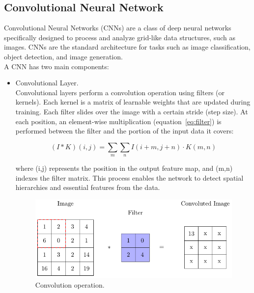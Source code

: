 \subsection{Convolutional Neural Network}

Convolutional Neural Networks (CNNs) are a class of deep neural networks specifically designed to process and analyze grid-like data structures, 
such as images. CNNs are the standard architecture for tasks such as image 
classification, object detection, and image generation.\\

A CNN has two main components:

\begin{itemize}
    \item Convolutional Layer.\\
    Convolutional layers perform a convolution operation using filters (or kernels).
    Each kernel is a matrix of learnable weights that are updated during training.
    Each filter slides over the image with a certain stride (step size). At each position, 
    an element-wise multiplication (equation~\ref{eq:filter}) is performed between the filter and the portion of the input data it covers:

    \begin{equation}
        (I * K)(i,j)= \sum_m \sum_n I(i+m,j+n) \cdot K(m,n)
    \label{eq:filter}
    \end{equation}

    where (i,j) represents the position in the output feature map, and (m,n) indexes the filter matrix.
    This process enables the network to detect spatial hierarchies and essential features from the data.

    \begin{figure}[h]
    \centering
    \includegraphics[scale=0.7]{Chapters/Chapter2/convolution/convolution.pdf}
    \caption{Convolution operation.}
    \end{figure}


\end{itemize}

